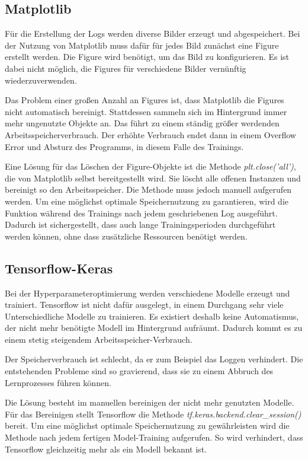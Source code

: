 \subsection{Matplotlib}
Für die Erstellung der Logs werden diverse Bilder erzeugt und abgespeichert.
Bei der Nutzung von Matplotlib muss dafür für jedes Bild zunächst eine Figure erstellt werden.
Die Figure wird benötigt, um das Bild zu konfigurieren.
Es ist dabei nicht möglich, die Figures für verschiedene Bilder vernünftig wiederzuverwenden.

Das Problem einer großen Anzahl an Figures ist, dass Matplotlib die Figures nicht automatisch bereinigt.
Stattdessen sammeln sich im Hintergrund immer mehr ungenutzte Objekte an.
Das führt zu einem ständig größer werdenden Arbeitsspeicherverbrauch.
Der erhöhte Verbrauch endet dann in einem Overflow Error und Absturz des Programms, in diesem Falle des Trainings.

Eine Lösung für das Löschen der Figure-Objekte ist die Methode \textit{plt.close('all')}, die von Matplotlib selbst bereitgestellt wird.
Sie löscht alle offenen Instanzen und bereinigt so den Arbeitsspeicher.
Die Methode muss jedoch manuell aufgerufen werden.
Um eine möglichst optimale Speichernutzung zu garantieren, wird die Funktion während des Trainings nach jedem geschriebenen Log ausgeführt.
Dadurch ist sichergestellt, dass auch lange Trainingsperioden durchgeführt werden können, ohne dass zusätzliche Ressourcen benötigt werden.

\subsection{Tensorflow-Keras}
Bei der Hyperparameteroptimierung werden verschiedene Modelle erzeugt und trainiert.
Tensorflow ist nicht dafür ausgelegt, in einem Durchgang sehr viele Unterschiedliche Modelle zu trainieren.
Es existiert deshalb keine Automatismus, der nicht mehr benötigte Modell im Hintergrund aufräumt.
Dadurch kommt es zu einem stetig steigendem Arbeitsspeicher-Verbrauch.

Der Speicherverbrauch ist schlecht, da er zum Beispiel das Loggen verhindert.
Die entstehenden Probleme sind so gravierend, dass sie zu einem Abbruch des Lernprozesses führen können.

Die Lösung besteht im manuellen bereinigen der nicht mehr genutzten Modelle.
Für das Bereinigen stellt Tensorflow die Methode \textit{tf.keras.backend.clear\_session()} bereit.
Um eine möglichst optimale Speichernutzung zu gewährleisten wird die Methode nach jedem fertigen Model-Training aufgerufen.
So wird verhindert, dass Tensorflow gleichzeitig mehr als ein Modell bekannt ist.

